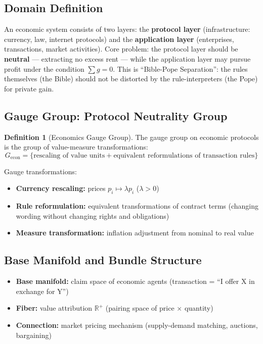 \documentclass[12pt,a4paper]{article}
\theoremstyle{plain}
\theoremstyle{definition}
\newtheorem{definition}[theorem]{Definition}
\newcommand{\R}{\mathbb{R}}
\begin{document}
\subsection{Domain Definition}

An economic system consists of two layers: the \textbf{protocol layer} (infrastructure: currency, law, internet protocols)
and the \textbf{application layer} (enterprises, transactions, market activities). Core problem: the protocol layer should be \textbf{neutral}
— extracting no excess rent — while the application layer may pursue profit under the condition $\sum g = 0$.
This is ``Bible-Pope Separation'': the rules themselves (the Bible) should not be distorted by the rule-interpreters (the Pope) for private gain.

\subsection{Gauge Group: Protocol Neutrality Group}

\begin{definition}[Economics Gauge Group]
The gauge group on economic protocols is the group of value-measure transformations:
\begin{equation}
    G_{\text{econ}} = \{\text{rescaling of value units} + \text{equivalent reformulations of transaction rules}\}
\end{equation}

Gauge transformations:
\begin{itemize}
    \item \textbf{Currency rescaling:} prices $p_i \mapsto \lambda p_i$ ($\lambda > 0$)
    \item \textbf{Rule reformulation:} equivalent transformations of contract terms (changing wording without changing rights and obligations)
    \item \textbf{Measure transformation:} inflation adjustment from nominal to real value
\end{itemize}
\end{definition}

\subsection{Base Manifold and Bundle Structure}

\begin{itemize}
    \item \textbf{Base manifold:} claim space of economic agents (transaction = ``I offer X in exchange for Y'')
    \item \textbf{Fiber:} value attribution $\R^+$ (pairing space of price $\times$ quantity)
    \item \textbf{Connection:} market pricing mechanism (supply-demand matching, auctions, bargaining)
\end{itemize}
\end{document}
